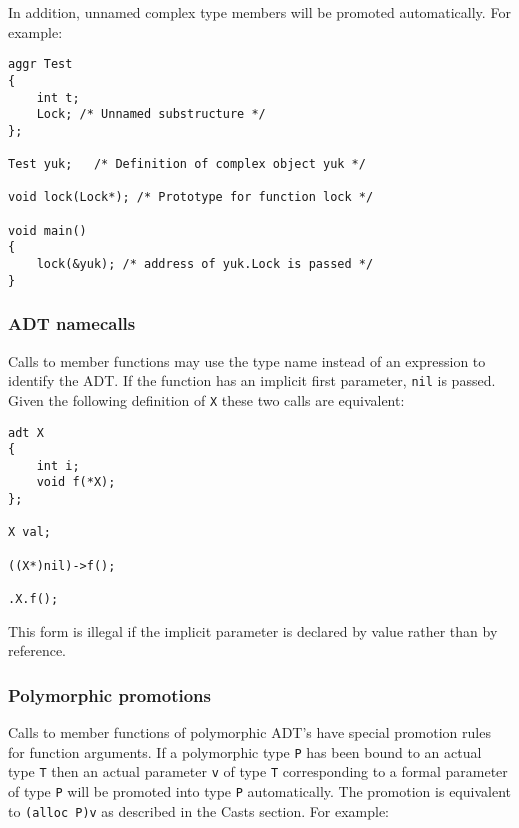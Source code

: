 In addition, unnamed complex type members will be promoted
automatically. For example:

\begin{lstlisting}
aggr Test
{
    int t;
    Lock; /* Unnamed substructure */
};

Test yuk;   /* Definition of complex object yuk */

void lock(Lock*); /* Prototype for function lock */

void main()
{
    lock(&yuk); /* address of yuk.Lock is passed */
}
\end{lstlisting}

\hypertarget{adt-namecalls}{%
\subsubsection{ADT namecalls}\label{adt-namecalls}}

Calls to member functions may use the type name instead of an expression
to identify the ADT. If the function has an implicit first parameter,
\passthrough{\lstinline!nil!} is passed. Given the following definition
of \passthrough{\lstinline!X!} these two calls are equivalent:

\begin{lstlisting}
adt X
{
    int i;
    void f(*X);
};

X val;

((X*)nil)->f();

.X.f();
\end{lstlisting}

This form is illegal if the implicit parameter is declared by value
rather than by reference.

\hypertarget{polymorphic-promotions}{%
\subsubsection{Polymorphic promotions}\label{polymorphic-promotions}}

Calls to member functions of polymorphic ADT's have special promotion
rules for function arguments. If a polymorphic type
\passthrough{\lstinline!P!} has been bound to an actual type
\passthrough{\lstinline!T!} then an actual parameter
\passthrough{\lstinline!v!} of type \passthrough{\lstinline!T!}
corresponding to a formal parameter of type \passthrough{\lstinline!P!}
will be promoted into type \passthrough{\lstinline!P!} automatically.
The promotion is equivalent to \passthrough{\lstinline!(alloc P)v!} as
described in the Casts section. For example:

